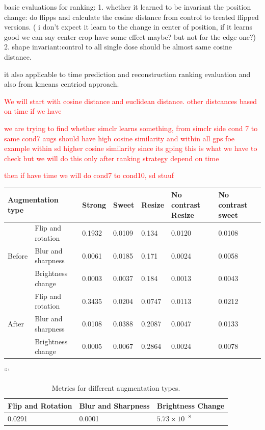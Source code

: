 basic evaluations for ranking:
1.
whether it learned to be invariant the position change:
do flipps and calculate the cosine distance from control to treated flipped versions. ( i don't expect it learn to the change in center of position, 
if it learns good we can say center crop have some effect maybe? but not for the edge one?)
2. 
shape invariant:control to all single dose should be almost same cosine distance.

it also applicable to time prediction and reconstruction ranking evaluation and also from kmeans centriod approach.


\textcolor{red}{We will start with cosine distance and euclidean distance. other distcances based on time if we have}


\textcolor{red}{we are trying to find whether simclr learns something, from simclr side cond 7 to same cond7 augs should have high cosine similarity and within all
 gps foe example within sd higher cosine similarity since its gping this is what we have to check but we will do this only after ranking strategy depend on time}


 \textcolor{red}{then if have time we will do cond7 to cond10, sd stuuf}

 \begin{table}
 \centering
 \begin{tabular}{ll*{5}{l}}
 \toprule
 \multicolumn{2}{l}{Augmentation type} & Strong & Sweet & Resize & No contrast Resize & No contrast sweet \\ 
 \midrule
 & Flip and rotation & 0.1932 & 0.0109 & 0.134 & 0.0120 & 0.0108 \\
 Before & Blur and sharpness & 0.0061 & 0.0185 & 0.171 & 0.0024 & 0.0058 \\
 & Brightness change & 0.0003 & 0.0037 & 0.184 & 0.0013 & 0.0043 \\
 \midrule
 & Flip and rotation & 0.3435 & 0.0204 & 0.0747 & 0.0113 & 0.0212 \\
 After & Blur and sharpness & 0.0108 & 0.0388 & 0.2087 & 0.0047 & 0.0133 \\
 & Brightness change & 0.0005 & 0.0067 & 0.2864 & 0.0024 & 0.0078 \\
 \bottomrule
 \end{tabular}
 \end{table}
 ```
    

 \begin{table}[H]
    \centering
    \begin{tabular}{@{}lll@{}}
    \toprule
    \textbf{Flip and Rotation} & \textbf{Blur and Sharpness} & \textbf{Brightness Change} \\ \midrule
    0.0291                     & 0.0001                     & $5.73 \times 10^{-8}$      \\ \bottomrule
    \end{tabular}
    \caption{Metrics for different augmentation types.}
    \label{tab:augmentation_metrics}
\end{table}
    



  